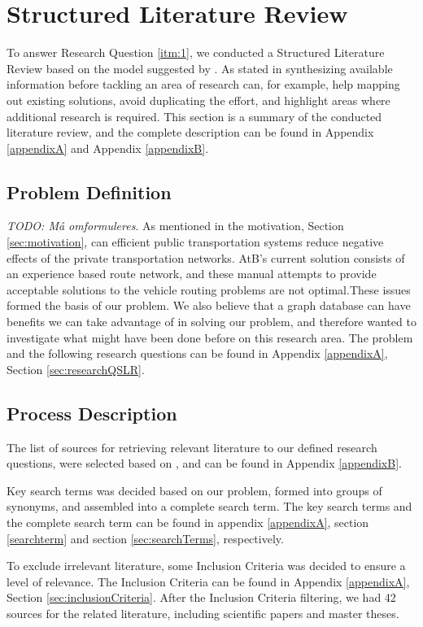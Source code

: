\section{Structured Literature Review}
\label{sec:structuredLiteratureReview}
To answer Research Question \vref{itm:1}, we conducted a Structured Literature Review based on the model suggested by \citet{kofod2014}. As stated in \citep{kofod2014} synthesizing available information before tackling an area of research can, for example, help mapping out existing solutions, avoid duplicating the effort, and highlight areas where additional research is required. This section is a summary of the conducted literature review, and the complete description can be found in Appendix \vref{appendixA} and Appendix \vref{appendixB}. 

\subsection{Problem Definition}
\emph{\color{blue} TODO: Må omformuleres}. 
As mentioned in the motivation, Section \vref{sec:motivation}, can efficient public transportation systems reduce negative effects of the private transportation networks. AtB's current solution consists of an experience based route network, and these manual attempts to provide acceptable solutions to the vehicle routing problems are not optimal.These issues formed the basis of our problem. We also believe that a graph database can have benefits we can take advantage of in solving our problem, and therefore wanted to investigate what might have been done before on this research area. The problem and the following research questions can be found in Appendix \ref{appendixA}, Section \vref{sec:researchQSLR}. 

\subsection{Process Description}
The list of sources for retrieving relevant literature to our defined research questions, were selected based on \citep[p.3]{kofod2014}, and can be found in Appendix \vref{appendixB}. 

Key search terms was decided based on our problem, formed into groups of synonyms, and assembled into a complete search term. The key search terms and the complete search term can be found in appendix \ref{appendixA}, section \vref{searchterm} and section \vref{sec:searchTerms}, respectively.

To exclude irrelevant literature, some Inclusion Criteria was decided to ensure a level of relevance. The Inclusion Criteria can be found in Appendix \ref{appendixA}, Section \vref{sec:inclusionCriteria}. After the Inclusion Criteria filtering, we had 42 sources for the related literature, including scientific papers and master theses. 

